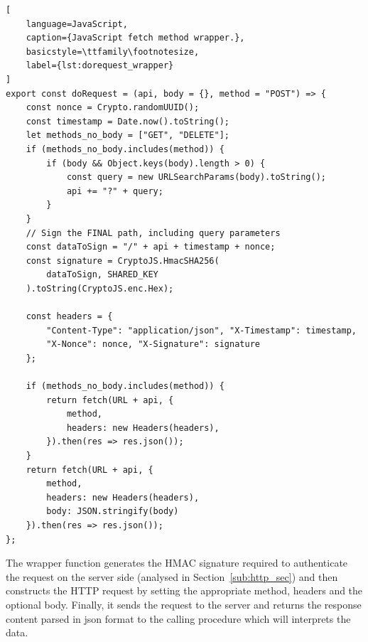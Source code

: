 \begin{lstlisting}[
    language=JavaScript,
    caption={JavaScript fetch method wrapper.},
    basicstyle=\ttfamily\footnotesize,
    label={lst:dorequest_wrapper}
]
export const doRequest = (api, body = {}, method = "POST") => {
    const nonce = Crypto.randomUUID(); 
    const timestamp = Date.now().toString();
    let methods_no_body = ["GET", "DELETE"];
    if (methods_no_body.includes(method)) {
        if (body && Object.keys(body).length > 0) {
            const query = new URLSearchParams(body).toString();
            api += "?" + query;
        }
    }
    // Sign the FINAL path, including query parameters
    const dataToSign = "/" + api + timestamp + nonce;
    const signature = CryptoJS.HmacSHA256(
        dataToSign, SHARED_KEY
    ).toString(CryptoJS.enc.Hex);

    const headers = {
        "Content-Type": "application/json", "X-Timestamp": timestamp,
        "X-Nonce": nonce, "X-Signature": signature
    };

    if (methods_no_body.includes(method)) {
        return fetch(URL + api, {
            method,
            headers: new Headers(headers),
        }).then(res => res.json());
    }
    return fetch(URL + api, {
        method,
        headers: new Headers(headers),
        body: JSON.stringify(body)
    }).then(res => res.json());
};
\end{lstlisting}

The wrapper function generates the HMAC signature required to authenticate the request on the server side (analysed in Section~\ref{sub:http_sec}) and then constructs the HTTP request by setting the appropriate method, headers and the optional body. Finally, it sends the request to the server and returns the response content parsed in \gls{json} format to the calling procedure which will interprets the data.